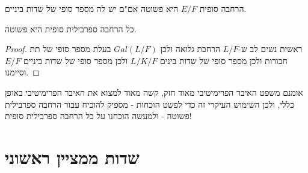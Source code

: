 \documentclass{tstextbook}
\begin{document}
\begin{proposition}
הרחבה סופית \(E / F\) היא פשוטה אם"ם יש לה מספר סופי של שדות ביניים.

\end{proposition}
\begin{theorem}
כל הרחבה ספרבילית סופית היא פשוטה.

\end{theorem}
\begin{proof}
ראשית נשים לב ש-\(L / F\) הרחבת גלואה ולכן \(Gal(L / F)\) בעלת מספר סופי של תת חבורות ולכן מספר סופי של שדות בינים \(L / K / F\) ולכן מספר סופי של שדות ביניים \(E / F\) וסיימנו.

\end{proof}
\begin{remark}
אומנם משפט האיבר הפרימיטיבי מאוד חזק, קשה מאוד למצוא את האיבר הפרימיטיבי באופן כללי, ולכן השימוש העיקרי זה כדי לפשט הוכחות - מספיק להוכיח עבור הרחבה ספרבילית פשוטה - ולמעשה הוכחנו על כל הרחבה ספרבילית סופית!

\end{remark}
\section{שדות ממציין ראשוני}
\end{document}
